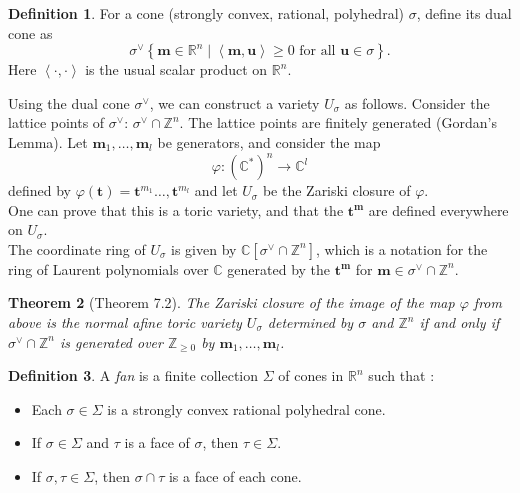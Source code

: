 \documentclass[a4paper]{article}
\newtheorem{theorem}{Theorem}[section]
\theoremstyle{definition}
\newtheorem{definition}[theorem]{Definition}
\begin{document}
  \begin{definition}
    For a cone (strongly convex, rational, polyhedral) $\sigma$, define its dual cone as 
    \[
      \sigma ^{ \vee}\left\{ \boldsymbol{m} \in \mathbb{R}^{n}\mid \left\langle \boldsymbol{m} ,\boldsymbol{u}  \right\rangle\geq 0 \text{ for all } \boldsymbol{ u } \in \sigma\right\}.
    \]
    Here $\left\langle \cdot, \cdot \right\rangle$ is the usual scalar product on $\mathbb{R}^{n}$.
  \end{definition}

  Using the dual cone $\sigma^{\vee}$, we can construct a variety $U_{\sigma}$ as follows. Consider the lattice points of $\sigma^{\vee}$: $\sigma^{\vee} \cap \mathbb{Z}^{n}$. The lattice points are finitely generated (Gordan's Lemma). Let $\boldsymbol{m} _{1}, \dots, \boldsymbol{m} _{l}$ be generators, and consider the map 
  \[
    \varphi \colon \left( \mathbb{C}^{*} \right) ^{n} \rightarrow  \mathbb{C}^{l}
  \]
  defined by $\varphi \left( \boldsymbol{t}  \right) = \boldsymbol{t} ^{m_{1}} \dots, \boldsymbol{t} ^{m_{l}}$ and let $U_{\sigma}$ be the Zariski closure of $\varphi$.\\
  One can prove that this is a toric variety, and that the $\boldsymbol{t^{m}} $ are defined everywhere on $U_{\sigma}$.\\
  The coordinate ring of $U_{\sigma}$ is given by $\mathbb{C} \left[ \sigma^{\vee} \cap \mathbb{Z}^{n} \right]$, which is a notation for the ring of Laurent polynomials over $\mathbb{C}$ generated by the $\boldsymbol{t^{m}} $ for $\boldsymbol{m}  \in \sigma^{\vee }\cap\mathbb{Z}^{n}$.

  \begin{theorem}[Theorem 7.2]
    The Zariski closure of the image of the map $\varphi $ from above is the normal afine toric variety $U_{\sigma}$ determined by $\sigma $ and $\mathbb{Z}^{n}$ if and only if $\sigma^{\vee} \cap \mathbb{Z}^{n}$ is generated over $\mathbb{Z}_{\geq 0}$ by $\boldsymbol{m} _{1}, \dots, \boldsymbol{m} _{l}$.
  \end{theorem}

  \begin{definition}
    A \emph{fan} is a finite collection $\Sigma$ of cones in $\mathbb{R}^{n}$ such that :
    \begin{itemize}
      \item Each $\sigma \in \Sigma$ is a strongly convex rational polyhedral cone.
      \item If $\sigma \in \Sigma$ and $\tau$ is a face of $\sigma$, then $\tau \in \Sigma$.
      \item If $\sigma, \tau \in \Sigma$, then $\sigma \cap \tau$ is a face of each cone.
    \end{itemize}
    
  \end{definition}
  
  
  
  
\end{document}
